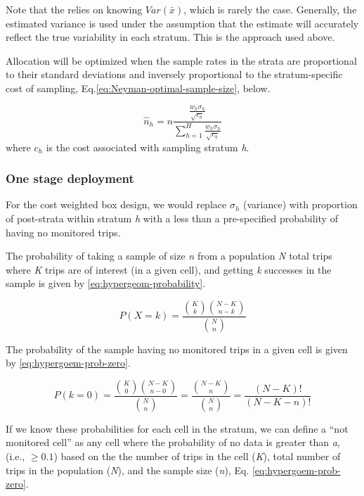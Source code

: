 \documentclass[
]{article}
\begin{document}
Note that the relies on knowing \(Var(\bar{x})\), which is rarely the case.
Generally, the estimated variance is used under the assumption that the
estimate will accurately reflect the true variability in each stratum. This is
the approach used above.

Allocation will be optimized when the sample rates in the strata are
proportional to their standard deviations and inversely proportional to the
stratum-specific cost of sampling, Eq.\eqref{eq:Neyman-optimal-sample-size},
below.

\begin{equation} 
  \hat{n}_{h} = n \frac{\frac{w_h \sigma_h}{\sqrt{c_h}}}{\sum_{h
= 1}^{H}\frac{w_h \sigma_h}{\sqrt{c_h}}}   
  \label{eq:Neyman-optimal-sample-size} 
\end{equation}
where \(c_h\) is the cost associated with sampling stratum \emph{h}.

\hypertarget{one-stage-deployment}{%
\subsubsection{One stage deployment}\label{one-stage-deployment}}

For the cost weighted box design, we would replace \(\sigma_h\) (variance) with
proportion of post-strata within stratum \emph{h} with a less than a pre-specified
probability of having no monitored trips.

The probability of taking a sample of size \emph{n} from a population \emph{N}
total trips where \emph{K} trips are of interest (in a given cell), and getting \emph{k}
successes in the sample is given by \eqref{eq:hypergeom-probability}.

\begin{equation}
  P\left(X = k\right) = \frac{\binom{K}{k}\binom{N - K}{n - k}}{\binom{N}{n}}
  \label{eq:hypergeom-probability} 
\end{equation}

The probability of the sample having no monitored trips in a given cell is given
by \eqref{eq:hypergoem-prob-zero}.

\begin{equation}
  P\left(k = 0\right) = \frac{\binom{K}{0}\binom{N - K}{n - 0}}{\binom{N}{n}} =
\frac{\binom{N - K}{n}}{\binom{N}{n}} = \frac{(N - K)!}{(N - K - n)!}
  \label{eq:hypergoem-prob-zero} 
\end{equation}

If we know these probabilities for each cell in the stratum, we can define a
``not monitored cell'' as any cell where the probability of no data is greater
than \emph{a}, (i.e., \(\geq 0.1\)) based on the the number of trips in the cell
(\emph{K}), total number of trips in the population (\emph{N}), and the sample size (\emph{n}),
Eq. \eqref{eq:hypergoem-prob-zero}.
\end{document}
